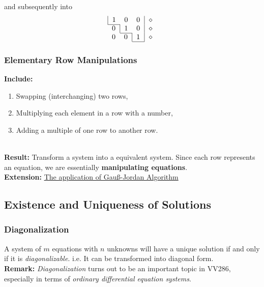 \documentclass{beamer}
\renewcommand{\emph}[1]{{\color{Turquoise3}\textsl{#1}}}
\newcommand{\nullspace}{~\\[15pt]}
\begin{document}
\begin{frame}
    and subsequently into \\
    \begin{equation}
        \begin{array}{c}
            \begin{tabular}{|ccc|c}
                1 & $0$ & $0$ & $\diamond$ \\ \cline{1-1}
            \end{tabular} \\
            \begin{tabular}{c|cc|c}
                0 & $1$ & $0$ & $\diamond$ \\ \cline{2-2}
            \end{tabular} \\
            \begin{tabular}{cc|c|c}
                0 & $0$ & $1$ & $\diamond$ \\
                \cline{3-3}
            \end{tabular}
        \end{array}
    \end{equation}
\end{frame}

\begin{frame}
    \frametitle{Elementary Row Manipulations}
    \textbf{Include:}
    \begin{enumerate}
        \item Swapping (interchanging) two rows,
        \item Multiplying each element in a row with a number,
        \item Adding a multiple of one row to another row.
    \end{enumerate}
    ~\\[15pt]

    \textbf{Result:} Transform a system into a equivalent system.
    Since each row represents an equation, we are essentially \textbf{manipulating equations}.\nullspace

    \textbf{Extension:}
    \href{https://en.wikipedia.org/wiki/Gaussian_elimination\#Applications}{The application of Gau\ss-Jordan Algorithm}
\end{frame}

\subsection{Existence and Uniqueness of Solutions}
\begin{frame}
    \frametitle{Diagonalization}
    A system of $m$ equations with $n$ unknowns will have a unique solution if and only if it is \emph{diagonalizable}. i.e. It can be transformed into diagonal form.\\[15pt]
    \textbf{Remark:} \emph{Diagonalization} turns out to be an important topic in VV286, especially in terms of \emph{ordinary differential equation systems}.
\end{frame}
\end{document}
